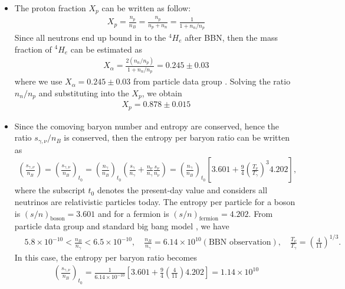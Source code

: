 \documentclass[Universe,article,submit,moreauthors,pdftex]{Definitions/mdpi}
\begin{document}
\begin{itemize}
  \item The proton fraction $X_p$ can be written as follow:
  \begin{align}
  X_p=\frac{n_p}{n_B}=\frac{n_p}{n_p+n_n}=\frac{1}{1+n_n/n_p}
  \end{align}
Since all neutrons end up bound in to the $^4H_e$ after BBN, then the mass fraction of $^4H_e$ can be estimated as 
\begin{align}
X_\alpha=\frac{2(n_n/n_p)}{1+n_n/n_p}=0.245\pm0.03
\end{align} 
where we use $X_\alpha=0.245\pm0.03$ from particle data group \cite{ParticleDataGroup:2022pth}. Solving the ratio $n_n/n_p$ and substituting into the $X_p$, we obtain
\begin{align}
X_p=0.878\pm0.015
\end{align}

  \item Since the comoving baryon number and entropy are conserved, hence the ratio $s_{\gamma,\nu}/n_B$ is conserved, then the entropy per baryon ratio can be written as
\begin{align}
\left(\frac{s_{\gamma,\nu}}{n_B}\right)=\left(\frac{s_{\gamma,\nu}}{n_B}\right)_{\!\!t_0}\!\!=\left(\frac{n_\gamma}{n_B}\right)_{\!\!t_0}\left(\frac{s_\gamma}{n_\gamma}+\frac{n_\nu}{n_\gamma}\frac{s_\nu}{n_\nu}\right)=\left(\frac{n_\gamma}{n_B}\right)_{\!\!t_0}\left[3.601+\frac{9}{4}\left(\frac{T_\nu}{T_\gamma}\right)^{\!\!3}4.202\right],
\end{align}
where the subscript $t_0$ denotes the present-day value and considers all neutrinos are relativistic particles today. The entropy per particle for a boson is $(s/n)_\mathrm{boson}=3.601$ and for a fermion is $(s/n)_\mathrm{fermion}=4.202$. From particle data group and standard big bang model \cite{ParticleDataGroup:2022pth,Kolb:1990vq}, we have
\begin{align}
&5.8\times10^{-10}<\frac{n_B}{n_\gamma}<6.5\times10^{-10},\quad\frac{n_B}{n_\gamma}=6.14\times10^{10}(\mathrm{BBN\,\,observation}),\quad\frac{T_\nu}{T_\gamma}=\left(\frac{4}{11}\right)^{1/3}.
\end{align}
In this case, the entropy per baryon ratio  becomes
\begin{align}
\left(\frac{s_{\gamma,\nu}}{n_B}\right)_{\!\!t_0}=\frac{1}{6.14\times10^{-10}}\left[3.601+\frac{9}{4}\left(\frac{4}{11}\right)4.202\right]=1.14\times10^{10}
\end{align}


\end{itemize}
\end{document}
